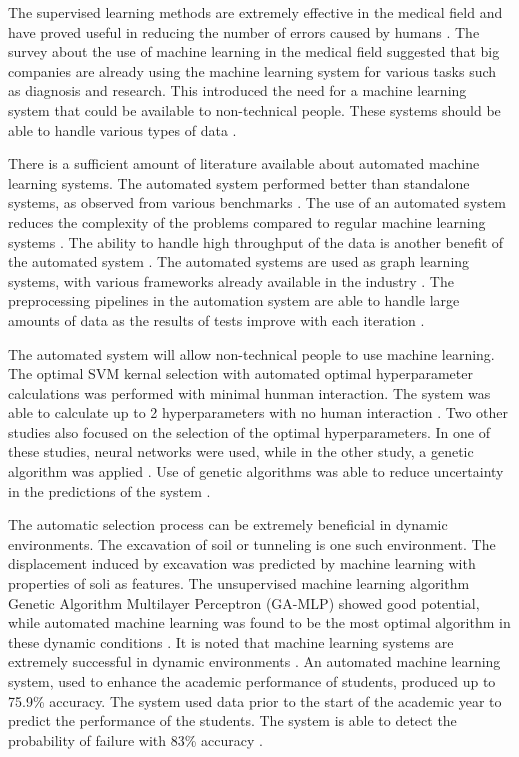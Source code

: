 \documentclass[a4paper,fleqn]{cas-dc}
\begin{document}
{    The supervised learning methods are extremely effective in the medical field and have proved useful in reducing the number of errors caused by humans \cite{ref_paper_11}. The survey about the use of machine learning in the medical field suggested that big companies are already using the machine learning system for various tasks such as diagnosis and research. This introduced the need for a machine learning system that could be available to non-technical people. These systems should be able to handle various types of data \cite{ref_paper_33}.
    
    There is a sufficient amount of literature available about automated machine learning systems. The automated system performed better than standalone systems, as observed from various benchmarks \cite{ref_paper_a_5}. The use of an automated system reduces the complexity of the problems compared to regular machine learning systems \cite{ref_paper_a_1}. The ability to handle high throughput of the data is another benefit of the automated system \cite{ref_paper_a_3}. The automated systems are used as graph learning systems, with various frameworks already available in the industry \cite{ref_paper_a_4}. The preprocessing pipelines in the automation system are able to handle large amounts of data as the results of tests improve with each iteration \cite{ref_paper_a_12}.
    
    The automated system will allow non-technical people to use machine learning. The optimal SVM kernal selection with automated optimal hyperparameter calculations was performed with minimal hunman interaction. The system was able to calculate up to 2 hyperparameters with no human interaction \cite{ref_paper_3}. Two other studies also focused on the selection of the optimal hyperparameters. In one of these studies, neural networks were used, while in the other study, a genetic algorithm was applied \cite{ref_paper_a_14,ref_paper_39}. Use of genetic algorithms was able to reduce uncertainty in the predictions of the system \cite{ref_paper_39}.
    
    The automatic selection process can be extremely beneficial in dynamic environments. The excavation of soil or tunneling is one such environment. The displacement induced by excavation was predicted by machine learning with properties of soli as features. The unsupervised machine learning algorithm Genetic Algorithm Multilayer Perceptron (GA-MLP) showed good potential, while automated machine learning was found to be the most optimal algorithm in these dynamic conditions \cite{ref_paper_1}. It is noted that machine learning systems are extremely successful in dynamic environments \cite{ref_paper_1,ref_paper_13}. An automated machine learning system, used to enhance the academic performance of students, produced up to 75.9\% accuracy. The system used data prior to the start of the academic year to predict the performance of the students. The system is able to detect the probability of failure with 83\% accuracy \cite{ref_paper_a_7}.

}
\end{document}
